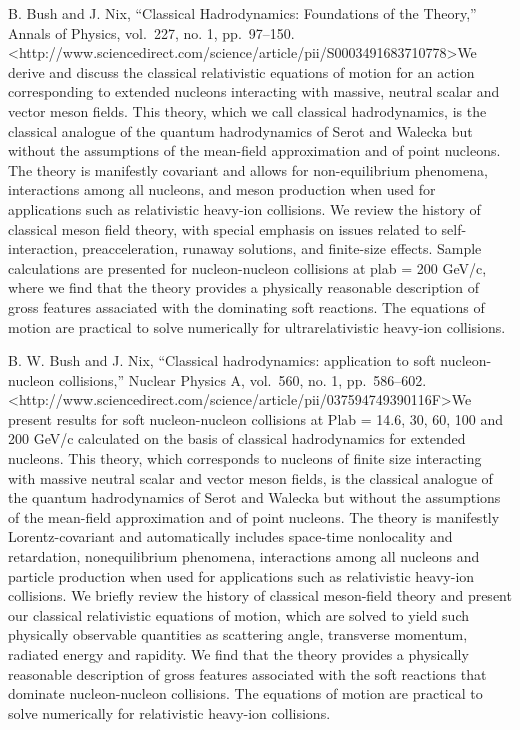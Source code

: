 \documentclass[]{article}
\begin{document}
B. Bush and J. Nix, ``Classical Hadrodynamics: Foundations of the
Theory,'' Annals of Physics, vol.~227, no. 1, pp.~97--150.
\textless{}http://www.sciencedirect.com/science/article/pii/S0003491683710778\textgreater{}We
derive and discuss the classical relativistic equations of motion for an
action corresponding to extended nucleons interacting with massive,
neutral scalar and vector meson fields. This theory, which we call
classical hadrodynamics, is the classical analogue of the quantum
hadrodynamics of Serot and Walecka but without the assumptions of the
mean-field approximation and of point nucleons. The theory is manifestly
covariant and allows for non-equilibrium phenomena, interactions among
all nucleons, and meson production when used for applications such as
relativistic heavy-ion collisions. We review the history of classical
meson field theory, with special emphasis on issues related to
self-interaction, preacceleration, runaway solutions, and finite-size
effects. Sample calculations are presented for nucleon-nucleon
collisions at plab = 200 GeV/c, where we find that the theory provides a
physically reasonable description of gross features assaciated with the
dominating soft reactions. The equations of motion are practical to
solve numerically for ultrarelativistic heavy-ion collisions.

B. W. Bush and J. Nix, ``Classical hadrodynamics: application to soft
nucleon-nucleon collisions,'' Nuclear Physics A, vol.~560, no. 1,
pp.~586--602.
\textless{}http://www.sciencedirect.com/science/article/pii/037594749390116F\textgreater{}We
present results for soft nucleon-nucleon collisions at Plab = 14.6, 30,
60, 100 and 200 GeV/c calculated on the basis of classical hadrodynamics
for extended nucleons. This theory, which corresponds to nucleons of
finite size interacting with massive neutral scalar and vector meson
fields, is the classical analogue of the quantum hadrodynamics of Serot
and Walecka but without the assumptions of the mean-field approximation
and of point nucleons. The theory is manifestly Lorentz-covariant and
automatically includes space-time nonlocality and retardation,
nonequilibrium phenomena, interactions among all nucleons and particle
production when used for applications such as relativistic heavy-ion
collisions. We briefly review the history of classical meson-field
theory and present our classical relativistic equations of motion, which
are solved to yield such physically observable quantities as scattering
angle, transverse momentum, radiated energy and rapidity. We find that
the theory provides a physically reasonable description of gross
features associated with the soft reactions that dominate
nucleon-nucleon collisions. The equations of motion are practical to
solve numerically for relativistic heavy-ion collisions.
\end{document}
